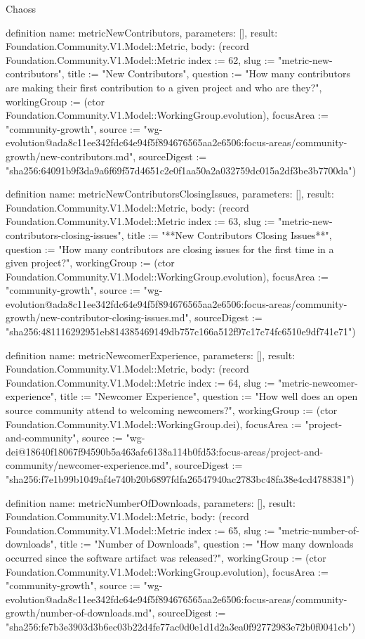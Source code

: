 \begin{lexlean}{Chaoss}
\begin{semanticmodule}
definition{
  name: metricNewContributors,
  parameters: [],
  result: Foundation.Community.V1.Model::Metric,
  body: (record Foundation.Community.V1.Model::Metric {index := 62, slug := "metric-new-contributors", title := "New Contributors", question := "How many contributors are making their first contribution to a given project and who are they?", workingGroup := (ctor Foundation.Community.V1.Model::WorkingGroup.evolution), focusArea := "community-growth", source := "wg-evolution@ada8c11ee342fdc64e94f5f894676565aa2e6506:focus-areas/community-growth/new-contributors.md", sourceDigest := "sha256:64091b9f3da9a6f69f57d4651c2e0f1aa50a2a032759dc015a2df3be3b7700da"})
}

definition{
  name: metricNewContributorsClosingIssues,
  parameters: [],
  result: Foundation.Community.V1.Model::Metric,
  body: (record Foundation.Community.V1.Model::Metric {index := 63, slug := "metric-new-contributors-closing-issues", title := "**New Contributors Closing Issues**", question := "How many contributors are closing issues for the first time in a given project?", workingGroup := (ctor Foundation.Community.V1.Model::WorkingGroup.evolution), focusArea := "community-growth", source := "wg-evolution@ada8c11ee342fdc64e94f5f894676565aa2e6506:focus-areas/community-growth/new-contributor-closing-issues.md", sourceDigest := "sha256:481116292951eb814385469149db757c166a512f97c17c74fc6510e9df741e71"})
}

definition{
  name: metricNewcomerExperience,
  parameters: [],
  result: Foundation.Community.V1.Model::Metric,
  body: (record Foundation.Community.V1.Model::Metric {index := 64, slug := "metric-newcomer-experience", title := "Newcomer Experience", question := "How well does an open source community attend to welcoming newcomers?", workingGroup := (ctor Foundation.Community.V1.Model::WorkingGroup.dei), focusArea := "project-and-community", source := "wg-dei@18640f18067f94590b5a463afe6138a114b0fd53:focus-areas/project-and-community/newcomer-experience.md", sourceDigest := "sha256:f7e1b99b1049af4e740b20b6897fdfa26547940ac2783bc48fa38e4cd4788381"})
}

definition{
  name: metricNumberOfDownloads,
  parameters: [],
  result: Foundation.Community.V1.Model::Metric,
  body: (record Foundation.Community.V1.Model::Metric {index := 65, slug := "metric-number-of-downloads", title := "Number of Downloads", question := "How many downloads occurred since the software artifact was released?", workingGroup := (ctor Foundation.Community.V1.Model::WorkingGroup.evolution), focusArea := "community-growth", source := "wg-evolution@ada8c11ee342fdc64e94f5f894676565aa2e6506:focus-areas/community-growth/number-of-downloads.md", sourceDigest := "sha256:fe7b3e3903d3b6ec03b22d4fe77ac0d0e1d1d2a3ea0f92772983e72b0f0041cb"})
}


\end{semanticmodule}
\end{lexlean}
